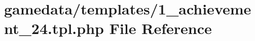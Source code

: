 \hypertarget{1__achievement__24_8tpl_8php}{\section{gamedata/templates/1\+\_\+achievement\+\_\+24.tpl.\+php File Reference}
\label{1__achievement__24_8tpl_8php}
}
